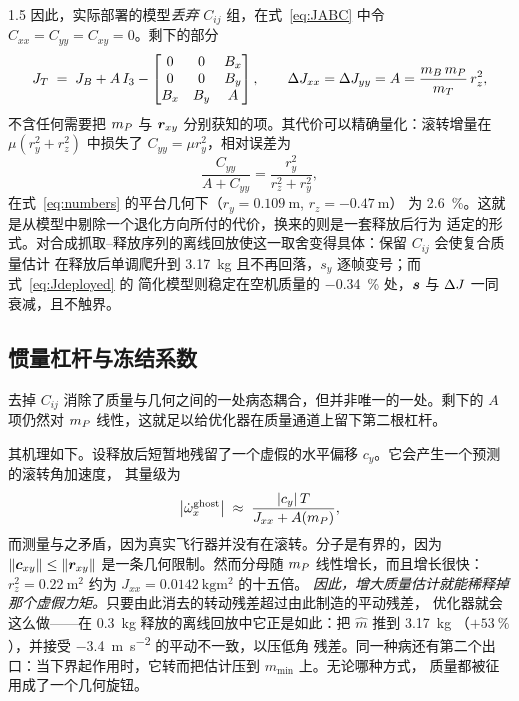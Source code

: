 \begin{spacing}{1.5}
因此，实际部署的模型\emph{丢弃} $C_{ij}$ 组，在式~\eqref{eq:JABC} 中令
$C_{xx}=C_{yy}=C_{xy}=0$。剩下的部分
\begin{equation}
J_T \;=\; J_B + A\,I_3 -
\begin{bmatrix} 0 & 0 & B_x \\ 0 & 0 & B_y \\ B_x & B_y & A\end{bmatrix},
\qquad
\Delta J_{xx}=\Delta J_{yy}=A=\frac{m_B\,m_P}{m_T}\,r_z^2 ,
\label{eq:Jdeployed}
\end{equation}
不含任何需要把 $m_P$ 与 $\bm{r}_{xy}$ 分别获知的项。其代价可以精确量化：滚转增量在
$\mu(r_y^2+r_z^2)$ 中损失了 $C_{yy}=\mu r_y^2$，相对误差为
\begin{equation}
\frac{C_{yy}}{A + C_{yy}} = \frac{r_y^2}{r_z^2+r_y^2},
\label{eq:Cerror}
\end{equation}
在式~\eqref{eq:numbers} 的平台几何下（$r_y=\SI{0.109}{\meter}$, $r_z=\SI{-0.47}{\meter}$）
为 \SI{2.6}{\percent}。这就是从模型中剔除一个退化方向所付的代价，换来的则是一套释放后行为
适定的形式。对合成抓取--释放序列的离线回放使这一取舍变得具体：保留 $C_{ij}$ 会使复合质量估计
在释放后单调爬升到 \SI{3.17}{\kg} 且不再回落，$s_y$ 逐帧变号；而式~\eqref{eq:Jdeployed} 的
简化模型则稳定在空机质量的 \SI{-0.34}{\percent} 处，$\bm{s}$ 与 $\Delta J$ 一同衰减，且不触界。

\subsection{惯量杠杆与冻结系数}\label{sec:model:Amode}

去掉 $C_{ij}$ 消除了质量与几何之间的一处病态耦合，但并非唯一的一处。剩下的 $A$ 项仍然对
$m_P$ 线性，这就足以给优化器在质量通道上留下第二根杠杆。

其机理如下。设释放后短暂地残留了一个虚假的水平偏移 $c_y$。它会产生一个预测的滚转角加速度，
其量级为
\begin{equation}
\bigl|\dot\omega_x^{\text{ghost}}\bigr| \;\approx\; \frac{|c_y|\,T}{J_{xx} + A(m_P)},
\label{eq:ghost}
\end{equation}
而测量与之矛盾，因为真实飞行器并没有在滚转。分子是有界的，因为
$\lVert\bm{c}_{xy}\rVert\le\lVert\bm{r}_{xy}\rVert$ 是一条几何限制。然而分母随 $m_P$ 线性增长，而且增长很快：
$r_z^2=\SI{0.22}{\meter\squared}$ 约为 $J_{xx}=\SI{0.0142}{\kg\meter\squared}$ 的十五倍。
\emph{因此，增大质量估计就能稀释掉那个虚假力矩。}只要由此消去的转动残差超过由此制造的平动残差，
优化器就会这么做——在 \SI{0.3}{\kg} 释放的离线回放中它正是如此：把 $\hat m$ 推到 \SI{3.17}{\kg}
（$+\SI{53}{\percent}$），并接受 \SI{-3.4}{\meter\per\second\squared} 的平动不一致，以压低角
残差。同一种病还有第二个出口：当下界起作用时，它转而把估计压到 $m_{\min}$ 上。无论哪种方式，
质量都被征用成了一个几何旋钮。


\end{spacing}
